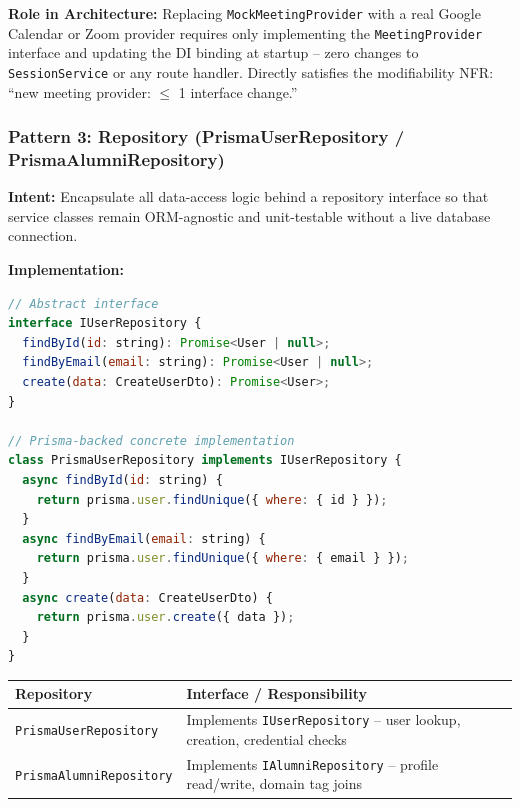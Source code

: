 \documentclass[12pt,a4paper]{article}
\begin{document}
\textbf{Role in Architecture:} Replacing \texttt{MockMeetingProvider} with a real Google Calendar or Zoom provider requires only implementing the \texttt{MeetingProvider} interface and updating the DI binding at startup -- zero changes to \texttt{SessionService} or any route handler. Directly satisfies the modifiability NFR: ``new meeting provider: $\leq$ 1 interface change.''

\vspace{1em}

\subsubsection{Pattern 3: Repository (PrismaUserRepository / PrismaAlumniRepository)}

\textbf{Intent:} Encapsulate all data-access logic behind a repository interface so that service classes remain ORM-agnostic and unit-testable without a live database connection.

\textbf{Implementation:}

\begin{lstlisting}[language=JavaScript, caption={Repository interface and Prisma implementation}]
// Abstract interface
interface IUserRepository {
  findById(id: string): Promise<User | null>;
  findByEmail(email: string): Promise<User | null>;
  create(data: CreateUserDto): Promise<User>;
}

// Prisma-backed concrete implementation
class PrismaUserRepository implements IUserRepository {
  async findById(id: string) {
    return prisma.user.findUnique({ where: { id } });
  }
  async findByEmail(email: string) {
    return prisma.user.findUnique({ where: { email } });
  }
  async create(data: CreateUserDto) {
    return prisma.user.create({ data });
  }
}
\end{lstlisting}

\begin{center}
\begin{tabular}{@{}p{4.8cm} p{7.2cm}@{}}
\toprule
\textbf{Repository} & \textbf{Interface / Responsibility} \\
\midrule
\texttt{PrismaUserRepository} & Implements \texttt{IUserRepository} -- user lookup, creation, credential checks \\
\texttt{PrismaAlumniRepository} & Implements \texttt{IAlumniRepository} -- profile read/write, domain tag joins \\
\bottomrule
\end{tabular}
\end{center}
\end{document}
